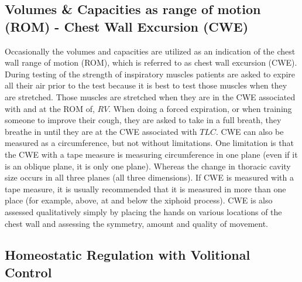 \subsection{Volumes \& Capacities as range of motion (ROM) - Chest Wall Excursion (CWE)} 

Occasionally the volumes and capacities are utilized as an indication of the chest wall range of motion (ROM), which is referred to as chest wall excursion (CWE). During testing of the strength of inspiratory muscles patients are asked to expire all their air prior to the test because it is best to test those muscles when they are stretched. Those muscles are stretched when they are in the CWE associated with and at the ROM of, $RV$. When doing a forced expiration, or when training someone to improve their cough, they are asked to take in a full breath, they breathe in until they are at the CWE associated with $TLC$. CWE can also be measured as a circumference, but not without limitations. One limitation is that the CWE with a tape measure is measuring circumference in one plane (even if it is an oblique plane, it is only one plane). Whereas the change in thoracic cavity size occurs in all three planes (all three dimensions). If CWE is measured with a tape measure, it is usually recommended that it is measured in more than one place (for example, above, at and below the xiphoid process). CWE is also assessed qualitatively simply by placing the hands on various locations of the chest wall and assessing the symmetry, amount and quality of movement.

\subsection{Homeostatic Regulation with Volitional Control} 


